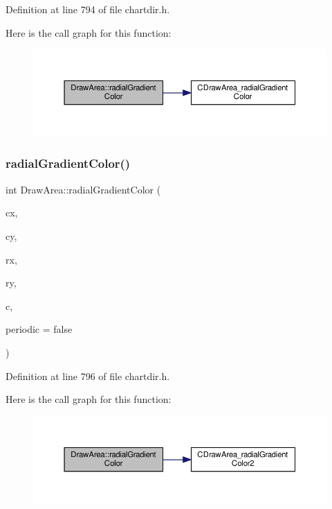 Definition at line 794 of file chartdir.\+h.

Here is the call graph for this function\+:
\nopagebreak
\begin{figure}[H]
\begin{center}
\leavevmode
\includegraphics[width=350pt]{class_draw_area_a2cbc34103fc8149714d6f2a9a7a6168c_cgraph}
\end{center}
\end{figure}
\mbox{\label{class_draw_area_a99ab6b0e1b68da01fb1c0bb36c405e22}} 
\subsubsection{\texorpdfstring{radial\+Gradient\+Color()}{radialGradientColor()}\hspace{0.1cm}{\footnotesize\ttfamily [2/2]}}
{\footnotesize\ttfamily int Draw\+Area\+::radial\+Gradient\+Color (\begin{DoxyParamCaption}\item[{int}]{cx,  }\item[{int}]{cy,  }\item[{int}]{rx,  }\item[{int}]{ry,  }\item[{\hyperlink{class_int_array}{Int\+Array}}]{c,  }\item[{bool}]{periodic = {\ttfamily false} }\end{DoxyParamCaption})\hspace{0.3cm}{\ttfamily [inline]}}



Definition at line 796 of file chartdir.\+h.

Here is the call graph for this function\+:
\nopagebreak
\begin{figure}[H]
\begin{center}
\leavevmode
\includegraphics[width=350pt]{class_draw_area_a99ab6b0e1b68da01fb1c0bb36c405e22_cgraph}
\end{center}
\end{figure}
\mbox{\label{class_draw_area_a321359fd3a279f7ede10d4998301cb89}} 
